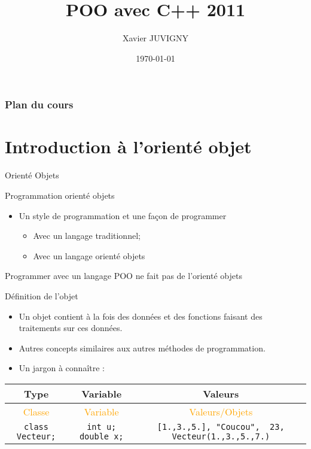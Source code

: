 \documentclass[handout,10pt]{beamer}
\title[C++\hspace{2em}]{POO avec C++ 2011}
\author[Xavier JUVIGNY]{Xavier JUVIGNY}
\date{\today}
\institute{ONERA}
\begin{document}

\begin{frame}
 \titlepage
\end{frame}

\begin{frame}
\frametitle{Plan du cours}
\tableofcontents
\end{frame}

\section{Introduction à l'orienté objet}

\begin{frame}[fragile]{Orienté Objets}
\tiny
\begin{block}{Programmation orienté objets}
\begin{itemize}
\item Un style de programmation et une façon de programmer
\begin{itemize}
\item Avec un langage traditionnel;
\item Avec un langage orienté objets
\end{itemize}
\end{itemize}
\alert{Programmer avec un langage POO ne fait pas de l'orienté objets}
\end{block}

\begin{block}{Définition de l'objet}
\begin{itemize}
\item Un objet contient à la fois des données et des fonctions faisant des traitements sur ces données.
\item Autres concepts similaires aux autres méthodes de programmation.
\item Un jargon à connaître :
\end{itemize}
\begin{tabular}{|c|c|c|}\hline
Type & Variable & Valeurs \\ \hline
\textcolor{orange}{Classe} & \textcolor{orange}{Variable} & \textcolor{orange}{Valeurs/Objets} \\ \hline
\lstinline$class Vecteur;$ & \lstinline$int u; double x;$ & \lstinline$[1.,3.,5.], "Coucou",  23, Vecteur(1.,3.,5.,7.)$ \\ \hline
\end{tabular}
\end{block}
\end{frame}
\end{document}
